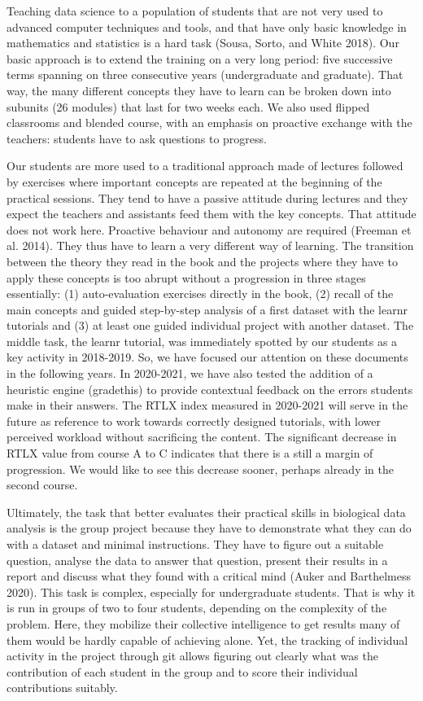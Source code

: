 \documentclass[
]{article}
\begin{document}
Teaching data science to a population of students that are not very used
to advanced computer techniques and tools, and that have only basic
knowledge in mathematics and statistics is a hard task (Sousa, Sorto,
and White 2018). Our basic approach is to extend the training on a very
long period: five successive terms spanning on three consecutive years
(undergraduate and graduate). That way, the many different concepts they
have to learn can be broken down into subunits (26 modules) that last
for two weeks each. We also used flipped classrooms and blended course,
with an emphasis on proactive exchange with the teachers: students have
to ask questions to progress.

Our students are more used to a traditional approach made of lectures
followed by exercises where important concepts are repeated at the
beginning of the practical sessions. They tend to have a passive
attitude during lectures and they expect the teachers and assistants
feed them with the key concepts. That attitude does not work here.
Proactive behaviour and autonomy are required (Freeman et al. 2014).
They thus have to learn a very different way of learning. The transition
between the theory they read in the book and the projects where they
have to apply these concepts is too abrupt without a progression in
three stages essentially: (1) auto-evaluation exercises directly in the
book, (2) recall of the main concepts and guided step-by-step analysis
of a first dataset with the learnr tutorials and (3) at least one guided
individual project with another dataset. The middle task, the learnr
tutorial, was immediately spotted by our students as a key activity in
2018-2019. So, we have focused our attention on these documents in the
following years. In 2020-2021, we have also tested the addition of a
heuristic engine (gradethis) to provide contextual feedback on the
errors students make in their answers. The RTLX index measured in
2020-2021 will serve in the future as reference to work towards
correctly designed tutorials, with lower perceived workload without
sacrificing the content. The significant decrease in RTLX value from
course A to C indicates that there is a still a margin of progression.
We would like to see this decrease sooner, perhaps already in the second
course.

Ultimately, the task that better evaluates their practical skills in
biological data analysis is the group project because they have to
demonstrate what they can do with a dataset and minimal instructions.
They have to figure out a suitable question, analyse the data to answer
that question, present their results in a report and discuss what they
found with a critical mind (Auker and Barthelmess 2020). This task is
complex, especially for undergraduate students. That is why it is run in
groups of two to four students, depending on the complexity of the
problem. Here, they mobilize their collective intelligence to get
results many of them would be hardly capable of achieving alone. Yet,
the tracking of individual activity in the project through git allows
figuring out clearly what was the contribution of each student in the
group and to score their individual contributions suitably.
\end{document}
